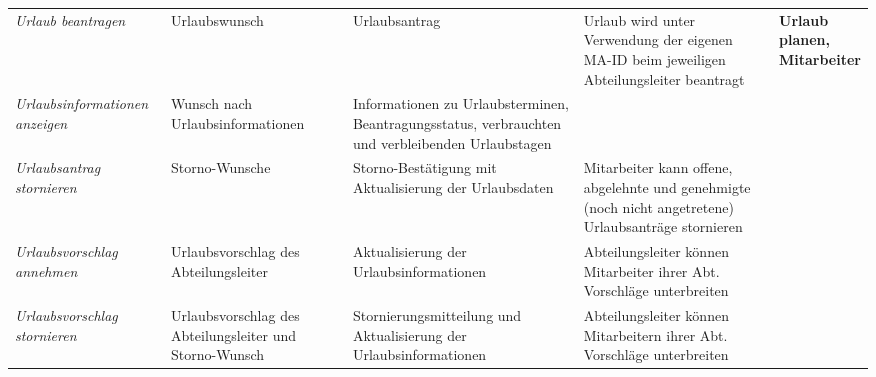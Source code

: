 {
\vspace{0,5cm}
\hspace{-3,5cm}
\footnotesize
\begin{tabular}{|p{3cm}|p{4cm}|p{4cm}|p{4cm}|p{2cm}|}
	\hline
		\textit{Urlaub beantragen} &
		Urlaubswunsch &
		Urlaubsantrag &
		Urlaub wird unter Verwendung der eigenen MA-ID beim jeweiligen Abteilungsleiter beantragt &
		\textbf{Urlaub \newline planen, \newline Mitarbeiter } \\
	\cline{1-4}
		\textit{Urlaubsinformationen anzeigen} &
		Wunsch nach Urlaubsinformationen &
		Informationen zu Urlaubsterminen, Beantragungs\-status, verbrauchten und verbleibenden Urlaubstagen &
		&
		\\
	\cline{1-4}
		\textit{Urlaubsantrag \newline stornieren} &
		Storno-Wunsche &
		Storno-Bestätigung mit Aktualisierung der Urlaubsdaten &
		Mitarbeiter kann offene, abgelehnte und genehmigte (noch nicht angetretene) Urlaubsanträge stornieren &
		\\
	\cline{1-4}
		\textit{Urlaubsvorschlag annehmen} &
		Urlaubsvorschlag des Abteilungsleiter &
		 Aktualisierung der Urlaubsinformationen &
		Abteilungsleiter können Mitarbeiter ihrer Abt. Vorschläge unterbreiten &
		\\
	\cline{1-4}
		\textit{Urlaubsvorschlag \newline stornieren} &
		Urlaubsvorschlag des Abteilungsleiter und Storno-Wunsch &
		Stornierungsmitteilung und Aktualisierung der Urlaubsinformationen &
		Abteilungsleiter können Mitarbeitern ihrer Abt. Vorschläge unterbreiten &
		\\
	\hline
\end{tabular}
}

